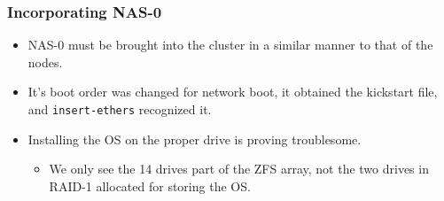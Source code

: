 \documentclass{beamer}
\begin{document}
\begin{frame}
\begin{multicols}{2}
  \end{multicols}
  
\end{frame}



\begin{frame}
  
  \frametitle{Incorporating NAS-0}

  \begin{itemize}
    \item NAS-0 must be brought into the cluster in a similar manner to that of
      the nodes.
    \item It's boot order was changed for network boot, it obtained the
      kickstart file, and {\tt insert-ethers} recognized it.
    \item Installing the OS on the proper drive is proving troublesome.
      \begin{itemize}
        \item We only see the 14 drives part of the ZFS array, not the two
          drives in RAID-1 allocated for storing the OS. 
      \end{itemize}
  \end{itemize}

\end{frame}

\end{document}
